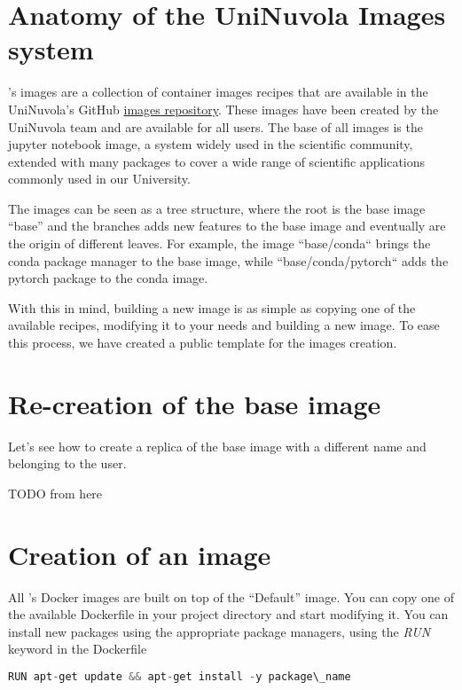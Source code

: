 \section{Anatomy of the UniNuvola Images system}\label{image_anatomy}
\uninuvola's images are a collection of container images recipes that are
available in the UniNuvola's GitHub \href{https://github.com/UniNuvola/images}
{images repository}. 
These images have been created by the UniNuvola team and are available for all users.
The base of all images is the jupyter notebook image, a system widely used in the
scientific community, extended with many packages to cover a wide range of
scientific applications commonly used in our University.

The images can be seen as a tree structure, where the root is the base image
``base'' and the branches adds new features to the base image and eventually 
are the origin of different leaves. 
For example, the image ``base/conda`` brings the conda package manager to the base
image, while ``base/conda/pytorch`` adds the pytorch package to the conda image.

With this in mind, building a new image is as simple as copying one of the
available recipes, modifying it to your needs and building a new image.
To ease this process, we have created a public template for the images creation.

\section{Re-creation of the base image}\label{image_recreation}
Let's see how to create a replica of the base image with a different name and belonging to the user.

TODO from here

\section{Creation of an image}\label{image_creation} All \uninuvola's Docker
images are built on top of the ``Default'' image. You can copy one of the
available  Dockerfile in your project directory and start modifying it. You can
install new packages using the appropriate package managers, using the
\textit{RUN} keyword in the Dockerfile

\begin{lstlisting}[language=python]
  RUN apt-get update && apt-get install -y package\_name
\end{lstlisting}

